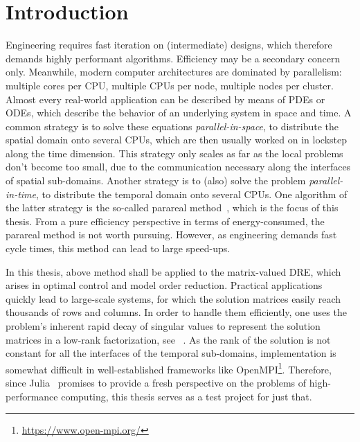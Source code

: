 \chapter{Introduction}

Engineering requires fast iteration on (intermediate) designs,
which therefore demands highly performant algorithms.
Efficiency may be a secondary concern only.
Meanwhile, modern computer architectures are dominated by parallelism:
multiple cores per CPU,
multiple CPUs per node,
multiple nodes per cluster.
Almost every real-world application can be described by means of \acp{PDE} or \acp{ODE},
which describe the behavior of an underlying system in space and time.
A common strategy is to solve these equations \emph{parallel-in-space},
\ie to distribute the spatial domain onto several CPUs,
which are then usually worked on in lockstep along the time dimension.
This strategy only scales as far as the local problems don't become too small,
due to the communication necessary along the interfaces of spatial sub-domains.
Another strategy is to (also) solve the problem \emph{parallel-in-time},
\ie to distribute the temporal domain onto several CPUs.
One algorithm of the latter strategy is the so-called parareal method~\cite{Lions2001},
which is the focus of this thesis.
From a pure efficiency perspective in terms of energy-consumed,
the parareal method is not worth pursuing.
However, as engineering demands fast cycle times,
this method can lead to large speed-ups.

In this thesis, above method shall be applied to the matrix-valued \ac{DRE},
which arises \eg in optimal control and model order reduction.
Practical applications quickly lead to large-scale systems,
for which the solution matrices easily reach thousands of rows and columns.
In order to handle them efficiently,
one uses the problem's inherent rapid decay of singular values
to represent the solution matrices in a low-rank factorization, see \eg~\cite{Penzl2000,Kuerschner2016,Lang2017}.
As the rank of the solution is not constant for all the interfaces of the temporal sub-domains,
implementation is somewhat difficult in well-established frameworks like OpenMPI\footnote{%
  \url{https://www.open-mpi.org/}
}.
Therefore, since Julia~\cite{Julia} promises to provide a fresh perspective on the problems of high-performance computing,
this thesis serves as a test project for just that.

